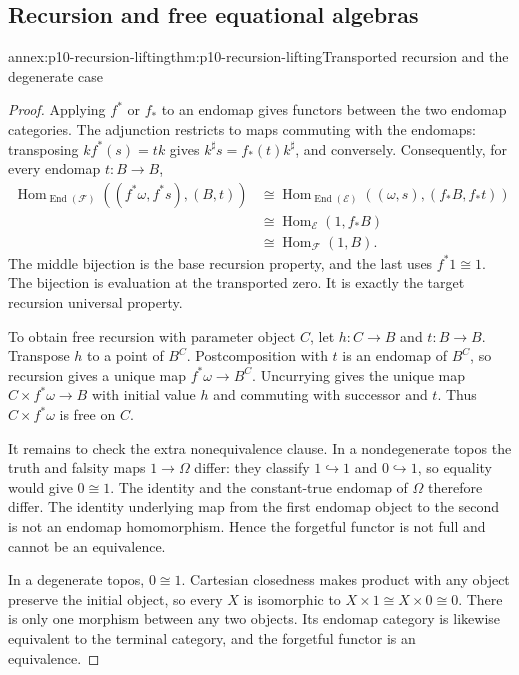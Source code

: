 \subsection{Recursion and free equational algebras}
\label{sec:annex-p10-recursion-free-algebras}

\begin{annexitem}{annex:p10-recursion-lifting}{thm:p10-recursion-lifting}{Transported recursion and the degenerate case}
\begin{proof}
Applying \(f^*\) or \(f_*\) to an endomap gives functors
between the two endomap categories.
The adjunction restricts to maps commuting with the endomaps:
transposing \(k f^*(s)=t k\) gives
\(k^\sharp s=f_*(t)k^\sharp\), and conversely.
Consequently, for every endomap \(t:B\to B\),
\[
 \begin{aligned}
 \operatorname{Hom}_{\operatorname{End}(\mathcal F)}
       ((f^*\omega,f^*s),(B,t))
 &\cong
 \operatorname{Hom}_{\operatorname{End}(\mathcal E)}
       ((\omega,s),(f_*B,f_*t))\\
 &\cong \operatorname{Hom}_{\mathcal E}(1,f_*B)\\
 &\cong \operatorname{Hom}_{\mathcal F}(1,B).
 \end{aligned}
\]
The middle bijection is the base recursion property, and the
last uses \(f^*1\cong1\).
The bijection is evaluation at the transported zero.
It is exactly the target recursion universal property.

To obtain free recursion with parameter object \(C\), let
\(h:C\to B\) and \(t:B\to B\).
Transpose \(h\) to a point of \(B^C\).
Postcomposition with \(t\) is an endomap of \(B^C\), so
recursion gives a unique map \(f^*\omega\to B^C\).
Uncurrying gives the unique map \(C\times f^*\omega\to B\)
with initial value \(h\) and commuting with successor and \(t\).
Thus \(C\times f^*\omega\) is free on \(C\).

It remains to check the extra nonequivalence clause.
In a nondegenerate topos the truth and falsity maps
\(1\to\Omega\) differ: they classify \(1\hookrightarrow1\)
and \(0\hookrightarrow1\), so equality would give \(0\cong1\).
The identity and the constant-true endomap of \(\Omega\)
therefore differ.
The identity underlying map from the first endomap object to
the second is not an endomap homomorphism.
Hence the forgetful functor is not full and cannot be an equivalence.

In a degenerate topos, \(0\cong1\).
Cartesian closedness makes product with any object preserve
the initial object, so every \(X\) is isomorphic to
\(X\times1\cong X\times0\cong0\).
There is only one morphism between any two objects.
Its endomap category is likewise equivalent to the terminal
category, and the forgetful functor is an equivalence.


\end{proof}
\end{annexitem}
